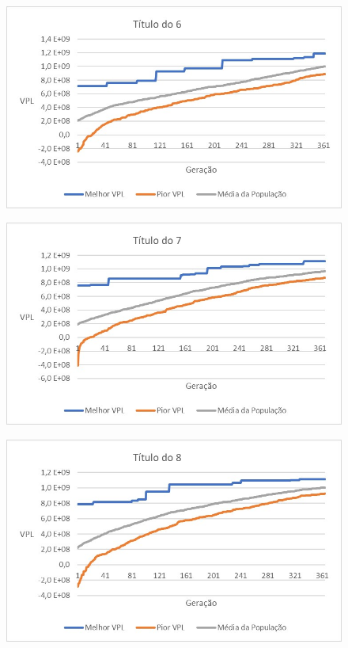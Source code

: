 \documentclass[12pt,a4paper]{report}
\begin{document}
\begin{figure}[H]
\centering

\includegraphics[scale=1]{6}

\end{figure}

\begin{figure}[H]
\centering

\includegraphics[scale=1]{7}

\end{figure}

\begin{figure}[H]
\centering

\includegraphics[scale=1]{8}

\end{figure}
\end{document}
